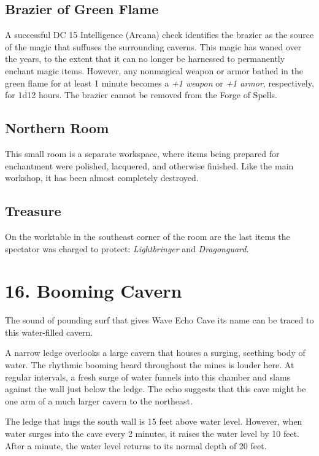\documentclass[10pt,a4paper,twoside,bg=print,twocolumn,openany,nodeprecatedcode]{dndbook}
\begin{document}
\subsection{Brazier of Green Flame}
A successful DC 15 Intelligence (Arcana) check identifies the brazier as the source of the magic that suffuses the surrounding caverns. This magic has waned over the years, to the extent that it can no longer be harnessed to permanently enchant magic items. However, any nonmagical weapon or armor bathed in the green flame for at least 1 minute becomes a \textit{+1 weapon} or \textit{+1 armor}, respectively, for 1d12 hours. The brazier cannot be removed from the Forge of Spells.

\subsection{Northern Room}
This small room is a separate workspace, where items being prepared for enchantment were polished, lacquered, and otherwise finished. Like the main workshop, it has been almost completely destroyed.

\subsection{Treasure}
On the worktable in the southeast corner of the room are the last items the spectator was charged to protect: \textit{Lightbringer} and \textit{Dragonguard}.

\section{16. Booming Cavern}
The sound of pounding surf that gives Wave Echo Cave its name can be traced to this water-filled cavern.

\begin{DndReadAloud}{}
A narrow ledge overlooks a large cavern that houses a surging, seething body of water. The rhythmic booming heard throughout the mines is louder here. At regular intervals, a fresh surge of water funnels into this chamber and slams against the wall just below the ledge. The echo suggests that this cave might be one arm of a much larger cavern to the northeast.

\end{DndReadAloud}

The ledge that hugs the south wall is 15 feet above water level. However, when water surges into the cave every 2 minutes, it raises the water level by 10 feet. After a minute, the water level returns to its normal depth of 20 feet.
\end{document}
